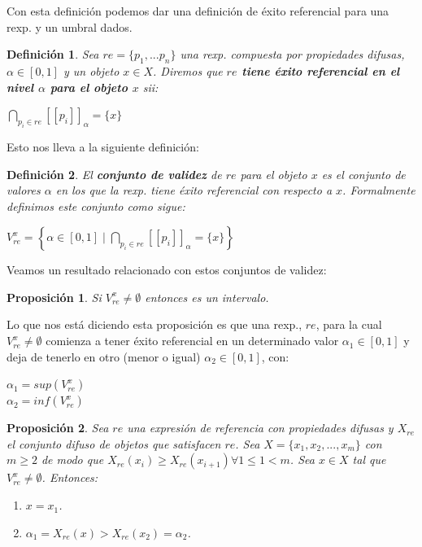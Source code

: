 \documentclass[10pt,a4paper]{article}
\newtheorem{definicion}{Definición}
\newtheorem{proposicion}{Proposición}
\begin{document}
Con esta definición podemos dar una definición de éxito referencial para una rexp. y un umbral dados.

\begin{definicion}
Sea $re = \lbrace p_1,...p_n\rbrace$ una rexp. compuesta por propiedades difusas, $\alpha \in [0,1]$ y un objeto $x \in X$. Diremos que \textbf{$re$ tiene éxito referencial en el nivel $\alpha$ para el objeto $x$} sii:

\begin{center}
$\underset{p_i \in re}{\bigcap}[[p_i]]_\alpha = \lbrace x \rbrace$
\end{center}
\end{definicion}

Esto nos lleva a la siguiente definición:

\begin{definicion}
El \textbf{conjunto de validez} de $re$ para el objeto $x$ es el conjunto de valores $\alpha$ en los que la rexp. tiene éxito referencial con respecto a $x$. Formalmente definimos este conjunto como sigue:
\begin{center}
$V_{re}^x = \left\lbrace \alpha \in [0,1] \mid \underset{p_i \in re}{\bigcap}[[p_i]]_\alpha = \lbrace x \rbrace \right\rbrace$
\end{center}
\end{definicion}

Veamos un resultado relacionado con estos conjuntos de validez:

\begin{proposicion}
Si $V_{re}^x \neq \emptyset$ entonces es un intervalo.
\end{proposicion}

Lo que nos está diciendo esta proposición es que una rexp., $re$, para la cual $V_{re}^x \neq \emptyset$ comienza a tener éxito referencial en un determinado valor $\alpha_1 \in [0,1]$ y deja de tenerlo en otro (menor o igual) $\alpha_2 \in [0,1]$, con:

\begin{center}
$\alpha_1 = sup(V_{re}^x)$\\
$\alpha_2 = inf(V_{re}^x)$
\end{center}

\begin{proposicion}
\label{prop3.7}
Sea $re$ una expresión de referencia con propiedades difusas y $X_{re}$ el conjunto difuso de objetos que satisfacen $re$. Sea $X = \lbrace x_1, x_2, ..., x_m \rbrace$ con $m \geq 2$ de modo que $X_{re}(x_i) \geq X_{re}(x_{i+1}) \forall 1 \leq 1 < m$. Sea $x \in X$ tal que $V_{re}^x \neq \emptyset$. Entonces:
\begin{enumerate}
\item $x = x_1$.
\item $\alpha_1 = X_{re}(x) > X_{re}(x_2) = \alpha_2$.
\end{enumerate}
\end{proposicion}
\end{document}
